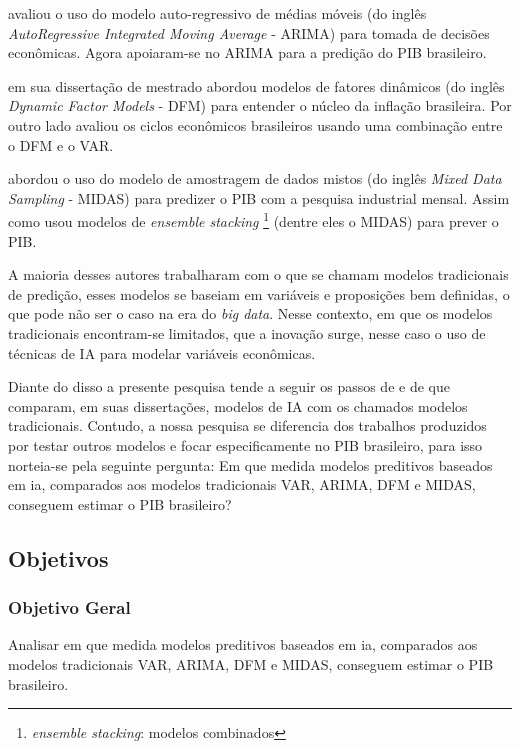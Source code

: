 \documentclass[12pt]{article}%
\begin{document}
	 avaliou o uso do modelo auto-regressivo de médias móveis (do inglês \textit{AutoRegressive Integrated Moving Average} - ARIMA) para tomada de decisões econômicas. Agora  apoiaram-se no ARIMA para a predição do PIB brasileiro. 
	
	 em sua dissertação de mestrado abordou modelos de fatores dinâmicos (do inglês  \textit{Dynamic Factor Models} - DFM) para entender o núcleo da inflação brasileira. Por outro lado  avaliou os ciclos econômicos brasileiros usando uma combinação entre o DFM e o VAR.
	
	 abordou o uso do modelo de amostragem de dados mistos (do inglês \textit{Mixed Data Sampling} - MIDAS) para predizer o PIB com a pesquisa industrial mensal. Assim como  usou modelos de \textit{ensemble stacking} \footnote{\textit{ensemble stacking}: modelos combinados} (dentre eles o MIDAS) para prever o PIB.
	
	A maioria desses autores trabalharam com o que se chamam modelos tradicionais de predição, esses modelos se baseiam em variáveis e proposições bem definidas, o que pode não ser o caso na era do \textit{big data}. Nesse contexto, em que os modelos tradicionais encontram-se limitados, que a inovação surge, nesse caso o uso de técnicas de IA para modelar variáveis econômicas.
	
	Diante do disso a presente pesquisa tende a seguir os passos de  e de  que comparam, em suas dissertações, modelos de IA com os chamados modelos tradicionais. Contudo, a nossa pesquisa se diferencia dos trabalhos produzidos por testar outros modelos e focar especificamente no PIB brasileiro, para isso norteia-se pela seguinte pergunta: Em que medida modelos preditivos baseados em \ac{ia}, comparados aos modelos tradicionais VAR, ARIMA, DFM e MIDAS, conseguem estimar o PIB brasileiro?
	
	\subsection{Objetivos}
	\subsubsection{Objetivo Geral}
	Analisar em que medida modelos preditivos baseados em \ac{ia}, comparados aos modelos tradicionais VAR, ARIMA, DFM e MIDAS, conseguem estimar o PIB brasileiro.
	
\end{document}
